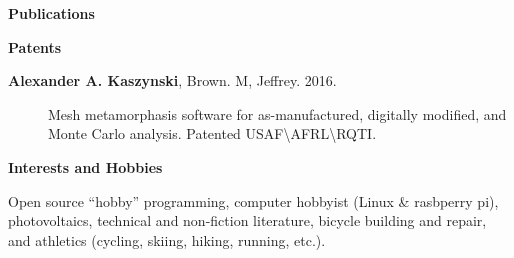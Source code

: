 \documentclass[letterpaper,11pt]{article}
\newcommand{\resheading}[1]{{\large \colorbox{mygrey}{\begin{minipage}{\textwidth}{\textbf{#1 \vphantom{p\^{E}}}}\end{minipage}}}}
\begin{document}
\resheading{Publications}

\begin{description}


  \item[] 
  \item[] 
  \item[] 
  \item[] 
  \item[] 
  \item[] 
  \item[] 
  \item[] 
  \item[] 
  \item[] 
  \item[] 
  \item[] 
  \item[] 
  \item[] 
  \item[] 
  \item[] 
  \item[] 
  \item[] 
  \item[] 
  \item[] 
  \item[] 
  \item[] 
  \item[] 
  \item[] 
  \item[] 
  \item[] 

\end{description}

\resheading{Patents}
\begin{description}
\item[\textbf{Alexander A. Kaszynski}, Brown. M, Jeffrey.  2016.]
Mesh metamorphasis software for as-manufactured, digitally modified, and Monte Carlo analysis.
Patented USAF\textbackslash AFRL\textbackslash RQTI.
\end{description}

\resheading{Interests and Hobbies}
\begin{description}
Open source ``hobby'' programming, computer hobbyist (Linux & rasbperry pi), photovoltaics, technical and non-fiction literature, bicycle building and repair, and athletics (cycling, skiing, hiking, running, etc.).
\end{description}
\end{document}

